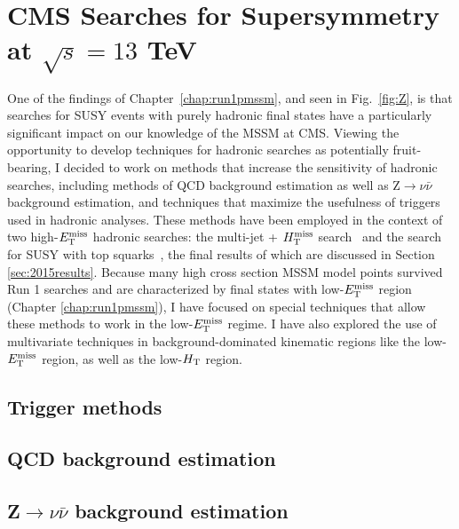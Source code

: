 \chapter{CMS Searches for Supersymmetry at $\sqrt{s}=13$ TeV}
\label{chap:susysearches}
One of the findings of Chapter~\ref{chap:run1pmssm}, and seen in Fig.~\ref{fig:Z}, is that searches for SUSY events with purely hadronic final states have a particularly significant impact on our knowledge of the MSSM at CMS. Viewing the opportunity to develop techniques for hadronic searches as potentially fruit-bearing, I   decided to work on methods that increase the sensitivity of hadronic searches, including methods of QCD background estimation as well as Z$\rightarrow\nu\bar{\nu}$ background estimation, and techniques that maximize the usefulness of triggers used in hadronic analyses. These methods have been employed in the context of two high-$E_{\text{T}}^{\rm miss}$ hadronic searches: the multi-jet + $H_{\text{T}}^{\rm miss}$ search~\cite{Khachatryan:2016kdk} and the search for SUSY with top squarks~\cite{CMS:2016nhb}, the final results of which are discussed in Section \ref{sec:2015results}. Because many high cross section MSSM model points  survived Run 1 searches and are characterized by final states with low-$E_{\text{T}}^{\rm miss}$ region (Chapter \ref{chap:run1pmssm}), I have focused on special techniques that allow these methods to work in the low-$E_{\text{T}}^{\rm miss}$ regime. I have also explored the use of multivariate techniques in background-dominated kinematic regions like the low-$E_{\text{T}}^{\rm miss}$ region, as well as the low-$H_{\rm T}$ region.


\section{Trigger methods}
\label{sec:anatrig}


\section{QCD background estimation}
\label{sec:qcd}


\section{Z$\rightarrow\nu\bar{\nu}$ background estimation}
\label{sec:zinv}




